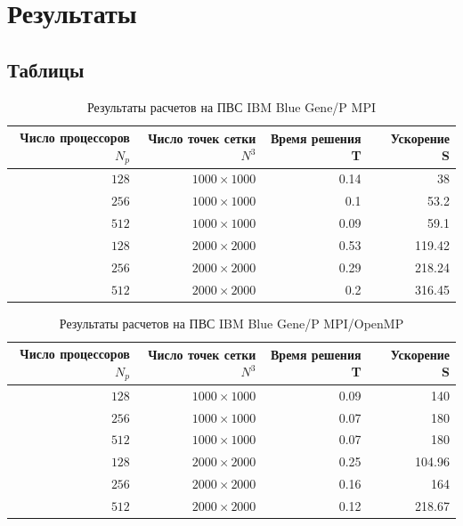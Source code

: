 \documentclass [12pt, a4paper] {article}
\let\stdsection\section
\renewcommand\section{\newpage\stdsection}
\begin{document}
\section{Результаты}
\subsection{Таблицы}

\begin{table}[htb]
    \centering
    \caption{Результаты расчетов на ПВС IBM Blue Gene/P MPI}
    \begin{tabular}{|r|r|r|r|}
        \hline
        Число процессоров $N_p$ & Число точек сетки $N^3$ & Время решения T & \
            Ускорение S \\ \hline
        $128$ & $ 1000 \times 1000 $ & 0.14 & 38 \\ 
        $256$ & $ 1000 \times 1000 $ & 0.1 & 53.2 \\ 
        $512$ & $ 1000 \times 1000 $ & 0.09 & 59.1 \\ \hline
        $128$ & $ 2000 \times 2000 $ & 0.53 & 119.42 \\ 
        $256$ & $ 2000 \times 2000 $ & 0.29 & 218.24 \\ 
        $512$ & $ 2000 \times 2000 $ & 0.2 & 316.45 \\ \hline
    \end{tabular}
\end{table}
\begin{table}[htb]
    \centering
    \caption{Результаты расчетов на ПВС IBM Blue Gene/P MPI/OpenMP}
    \begin{tabular}{r|r|r|r}
        \hline
        Число процессоров $N_p$ & Число точек сетки $N^3$ & Время решения T & \
            Ускорение S \\ \hline
        $128$ & $ 1000 \times 1000 $ & 0.09 & 140 \\ 
        $256$ & $ 1000 \times 1000 $ & 0.07 & 180 \\ 
        $512$ & $ 1000 \times 1000 $ & 0.07 & 180 \\ \hline
        $128$ & $ 2000 \times 2000 $ & 0.25 & 104.96 \\ 
        $256$ & $ 2000 \times 2000 $ & 0.16 & 164 \\ 
        $512$ & $ 2000 \times 2000 $ & 0.12 & 218.67 \\
    \end{tabular}
\end{table}
\end{document}
